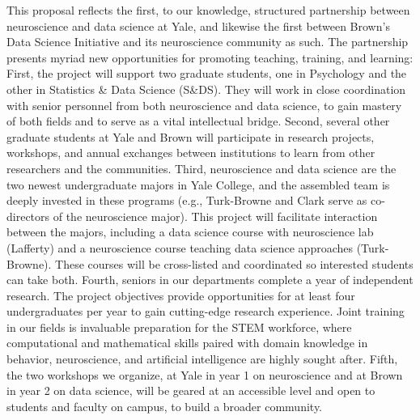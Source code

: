 
This proposal reflects the first, to our knowledge, structured
partnership between neuroscience and data science at Yale, and likewise the first between Brown's Data Science Initiative and its neuroscience community as such. The partnership
presents myriad new opportunities for promoting teaching, training, and
learning: First, the project will support two graduate students, one in
Psychology and the other in Statistics \& Data Science (S\&DS). They will
work in close coordination with senior personnel from both neuroscience
and data science, to gain mastery of both fields and to serve as a vital intellectual bridge. Second, several other
graduate students at Yale and Brown will participate in research
projects, workshops, and annual exchanges between institutions to learn
from other researchers and the communities. Third, neuroscience and data
science are the two newest undergraduate majors in Yale College, and the
assembled team is deeply invested in these programs (e.g., Turk-Browne
and Clark serve as co-directors of the neuroscience major). This project
will facilitate interaction between the majors, including a data science
course with neuroscience lab (Lafferty) and a neuroscience course
teaching data science approaches (Turk-Browne). These courses will be
cross-listed and coordinated so interested students can take both.
Fourth, seniors in our departments complete a year of independent
research. The project objectives provide opportunities for at least four
undergraduates per year to gain cutting-edge research experience. Joint
training in our fields is invaluable preparation for the STEM workforce,
where computational and mathematical skills paired with domain knowledge
in behavior, neuroscience, and artificial intelligence are highly sought
after. Fifth, the two workshops we organize, at Yale in year 1 on
neuroscience and at Brown in year 2 on data science, will be geared at
an accessible level and open to students and faculty on campus, to build
a broader community.

